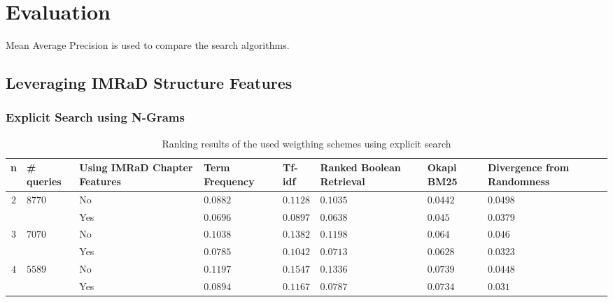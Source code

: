 \chapter{Evaluation}
\label{cha:evaluation}
Mean Average Precision is used to compare the search algorithms.

\section{Leveraging IMRaD Structure Features}

\subsection{Explicit Search using N-Grams}

\begin{table}[b]
  \begin{adjustwidth}{-2cm}{}
    \begin{tabular}{ c C{1.5cm} C{2.1cm} C{2.1cm} C{2.1cm} C{2.1cm} C{2.1cm} C{2.1cm} }
      \toprule
      \textbf{n} & \textbf{\# queries} & \textbf{Using IMRaD Chapter Features} & \textbf{Term Frequency} & \textbf{Tf-idf} & \textbf{Ranked Boolean Retrieval} & \textbf{Okapi BM25} & \textbf{Divergence from Randomness} \\ \midrule
       &  & No  & $0.0882$ & $0.1128$ & $0.1035$ & $0.0442$ & $0.0498$  \\
                                                    && Yes & $0.0696$ & $0.0897$ & $0.0638$ & $0.045$  & $0.0379$  \\ \midrule
       &  & No  & $0.1038$ & $0.1382$ & $0.1198$ & $0.064$  & $0.046$  \\
                                                    && Yes & $0.0785$ & $0.1042$ & $0.0713$ & $0.0628$ & $0.0323$  \\ \midrule
       &  & No  & $0.1197$ & $0.1547$ & $0.1336$ & $0.0739$ & $0.0448$  \\
                                                    && Yes & $0.0894$ & $0.1167$ & $0.0787$ & $0.0734$ & $0.031$  \\
      \bottomrule
    \end{tabular}
  \caption[Ranking results with explicit search]{Ranking results of the used weigthing schemes using explicit search}
  \label{tbl:ranking_result_explicit}
  \end{adjustwidth}
\end{table}

